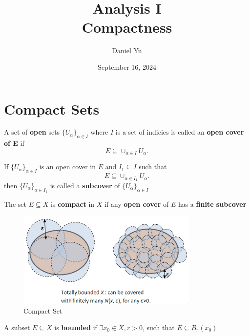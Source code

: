 \documentclass[a4paper]{article}
\title{\Huge{Analysis I}\\ Compactness}
\author{\huge{Daniel Yu}}
\date{September 16, 2024}
\begin{document}
\maketitle
\newpage%
\tableofcontents
\pagebreak
\section{Compact Sets}

\begin{definition}
  A set of \textbf{open} sets $\{U_{\alpha}\}_{\alpha \in I}$ where $I$ is a set of indicies is called an 
  \textbf{open cover of E} if 
  \[
    E \subseteq \cup_{\alpha \in I} U_\alpha 
  .\]  
\end{definition}

\begin{definition}
  If $\{U_{\alpha}\}_{\alpha \in I}$ is an open cover in $E$ and  $I_1 \subseteq I$ such that 
   \[
     E \subseteq \cup_{\alpha \in I_1} U_\alpha 
  .\] 
  then $\{U_{\alpha}\}_{\alpha \in I_1}$ is called a \textbf{subcover} of $\{U_{\alpha}\}_{\alpha \in I}$ 
\end{definition}

\begin{definition}
  The set $E \subseteq X$ is \textbf{compact} in $X$ if any \textbf{open cover} of $E$ has a \textbf{finite subcover} 
\end{definition}

\begin{figure}[h]
  \centering
  \includegraphics[width=0.8\textwidth]{assets/compact_set_ex.png}
  \caption{Compact Set}
  \label{fig:compact_set_ex}
\end{figure}

\begin{definition}
  A subset $E \subseteq X$ is \textbf{bounded} if  $\exists x_0 \in X, r >0$, such that  $E \subseteq B_r(x_0)$
\end{definition}
\end{document}

